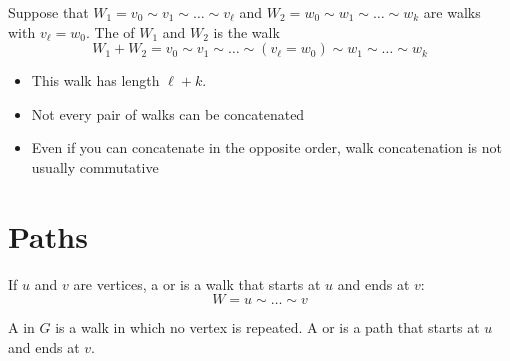 \documentclass
[ignorenonframetext,14pt,aspectratio=169]
{ngelessonslides}
\begin{document}

\begin{frame}[label=concat-def]
\begin{definition}
Suppose that $W_1 = v_0 \sim v_1 \sim \dots \sim v_\ell$ and
$W_2 = w_0 \sim w_1 \sim \dots \sim w_k$
are walks with $v_\ell = w_0$.  The  of $W_1$ and $W_2$
is the walk
\[
   W_1 + W_2 = v_0 \sim v_1 \sim \dots \sim (v_\ell = w_0) \sim w_1 \sim \dots \sim w_k
\]
\end{definition}
\begin{itemize}
\item This walk has length $\ell+k$.
\item Not every pair of walks can be concatenated
\item Even if you can concatenate in the opposite order, walk concatenation is not usually commutative
\end{itemize}
\end{frame}

\section{Paths}

\begin{frame}[label=path-def]
\begin{definition}
    If $u$ and $v$ are vertices, a  or  is a walk that starts at $u$ and ends at $v$:
    \[
        W = u \sim \dots \sim v
    \]
\end{definition}
\begin{definition}
    A  in $G$ is a walk in which no vertex is repeated.
    A  or  is a path that starts at $u$ and ends at $v$.
\end{definition}
\end{frame}
\end{document}
